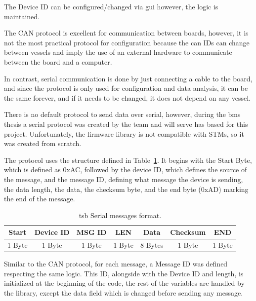         The Device ID can be configured/changed via \ac{gui} however, the logic is maintained.

        The CAN protocol is excellent for communication between boards, however, it is not the most practical protocol for configuration because the \ac{can} IDs can change between vessels and imply the use of an external hardware to communicate between the board and a computer.

        In contrast, serial communication is done by just connecting a cable to the board, and since the protocol is only used for configuration and data analysis, it can be the same forever, and if it needs to be changed, it does not depend on any vessel. 

        There is no default protocol to send data over serial, however, during the \ac{bms} thesis a serial protocol was created by the team and will serve has based for this project. Unfortunately, the firmware library is not compatible with STMs, so it was created from scratch.

        The protocol uses the structure defined in Table~\ref{tab:serial_message_format}. It begins with the Start Byte, which is defined as 0xAC, followed by the device ID, which defines the source of the message, and the message ID, defining what message the device is sending, the data length, the data, the checksum byte, and the end byte (0xAD) marking the end of the message.

        \begin{table}[!h]
            \centering
            \caption{\ac{tsb} Serial messages format.}
            \label{tab:serial_message_format}
            \begin{tabular}{|c|c|c|c|c|c|c|}
                \hline
                \textbf{Start} & \textbf{Device ID} & \textbf{MSG ID} & \textbf{LEN} & \textbf{Data} & \textbf{Checksum} & \textbf{END} \\ \hline
                1 Byte & 1 Byte & 1 Byte & 1 Byte & 8 Bytes & 1 Byte & 1 Byte \\ \hline
            \end{tabular}
        \end{table}
        
        Similar to the CAN protocol, for each message, a Message ID was defined respecting the same logic. This ID, alongside with the Device ID and length, is initialized at the beginning of the code, the rest of the variables are handled by the library, except the data field which is changed before sending any message.
        
